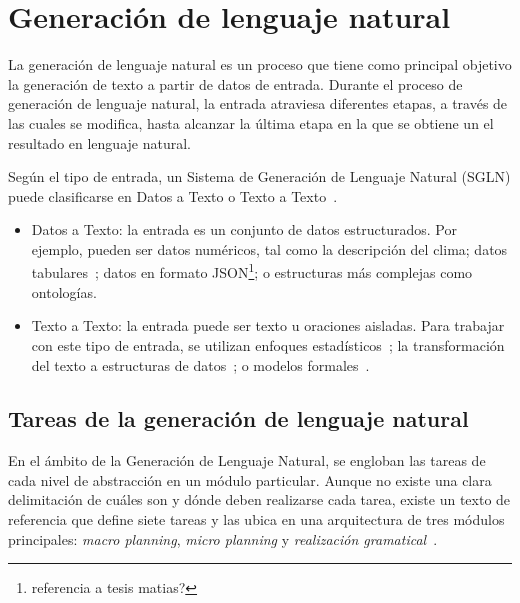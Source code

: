 \section{Generación de lenguaje natural}
\label{sec:tareas_gnl}
La generación de lenguaje natural es un proceso que tiene como principal objetivo la generación de texto a partir de datos de entrada.
Durante el proceso de generación de lenguaje natural, la entrada atraviesa diferentes etapas, a través de las cuales se modifica, hasta alcanzar la última etapa en la que se obtiene un el resultado en lenguaje natural.

Según el tipo de entrada, un Sistema de Generación de Lenguaje Natural (SGLN) puede clasificarse en Datos a Texto o Texto a Texto~\cite{vicente2015generacion}.
\begin{itemize}
    \item Datos a Texto: la entrada es un conjunto de datos estructurados. Por ejemplo, pueden ser datos numéricos, tal como la descripción del clima; datos  tabulares~\cite{mahapatra2016statistical}; datos en formato JSON\footnote{referencia a tesis matias?}; o estructuras más complejas como ontologías.
    \item Texto a Texto: la entrada puede ser texto u oraciones aisladas. Para trabajar con este tipo de entrada, se utilizan enfoques estadísticos~\cite{mittal1999ultra}; la transformación del texto a estructuras de datos~\cite{saldanha2004creation}; o modelos formales~\cite{guo2018long}.
\end{itemize}

\subsection{Tareas de la generación de lenguaje natural}
En el ámbito de la Generación de Lenguaje Natural, se engloban las tareas de cada nivel de abstracción en un módulo particular. Aunque no existe una clara delimitación de cuáles son y dónde deben realizarse cada tarea, existe un texto de referencia que define siete tareas y las ubica en una arquitectura de tres módulos principales: \emph{macro planning}, \emph{micro planning} y \emph{realización gramatical}~\cite{vicente2015generacion}.

